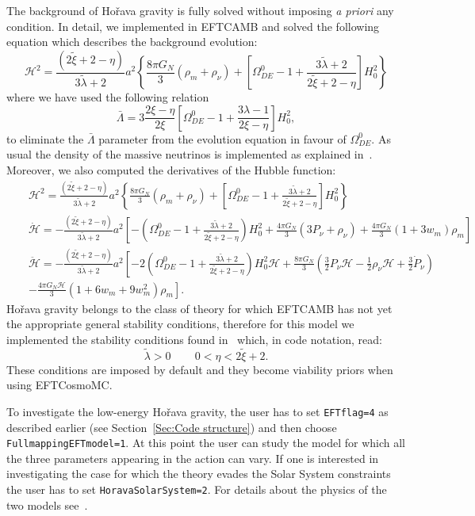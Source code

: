 \documentclass[prd,nofootinbib,showpacs]{revtex4}
\def\be{\begin{equation}}
\def\ee{\end{equation}}
\def\ba{\begin{eqnarray}}
\def\ea{\end{eqnarray}}
\def\l{\left}
\def\r{\right}
\def\f{\frac}
\def\nn{\nonumber}
\def\hub{{\mathcal H}}
\begin{document}
{The background of Ho\v rava gravity is fully solved without imposing \textit{a priori} any condition. In detail, we implemented in EFTCAMB and solved the following equation which describes the  background  evolution:
\be
\hub^2=\f{(2\tilde{\xi}+2-\eta)}{3\tilde{\lambda}+2}a^2\l\{\f{8\pi G_N}{3}(\rho_m+\rho_{\nu})+\l[\Omega_{DE}^0-1+ \f{3\tilde{\lambda}+2}{2\tilde{\xi}+2-\eta}\r]H_0^2 \r\}
\ee
where we have used the following relation
\be
\bar{\Lambda}= 3\f{2\xi-\eta}{2\xi}\l[\Omega_{DE}^0-1+\f{3\lambda-1}{2\xi-\eta}\r]H_0^2,
\ee
to eliminate the $\bar{\Lambda}$ parameter from the evolution equation in favour of $\Omega_{DE}^0$. As usual the density of the massive neutrinos is implemented as explained in~\cite{Hu:2014sea}. Moreover, we also computed the  derivatives of the Hubble function:
\ba
&&\hub^2=\f{(2\tilde{\xi}+2-\eta)}{3\tilde{\lambda}+2}a^2\l\{\f{8\pi G_N}{3}(\rho_m+\rho_{\nu})+\l[\Omega_{DE}^0-1+ \f{3\tilde{\lambda}+2}{2\tilde{\xi}+2-\eta}\r]H_0^2 \r\} \nn \\
&&\dot{\hub}= -\f{(2\tilde{\xi}+2-\eta)}{3\tilde{\lambda}+2}a^2\l[-\l(\Omega_{DE}^0-1+ \f{3\tilde{\lambda}+2}{2\tilde{\xi}+2-\eta}\r)H_0^2+\f{4\pi G_N}{3}(3P_{\nu}+\rho_{\nu})+\f{4\pi G_N}{3}(1+3w_m)\rho_m\r]  \nn \\
&&\ddot{\hub}=-\f{(2\tilde{\xi}+2-\eta)}{3\tilde{\lambda}+2}a^2\l[-2\l(\Omega_{DE}^0-1+ \f{3\tilde{\lambda}+2}{2\tilde{\xi}+2-\eta}\r)H_0^2\hub+\f{8\pi G_N}{3}(\f{3}{2}P_{\nu}\hub-\f{1}{2}\rho_{\nu}\hub+\f{3}{2}\dot{P}_{\nu}) \r. \nn \\&&\l.-\f{4\pi G_N \hub}{3}(1+6w_m +9w_m^2)\rho_m\r].
\ea
%
Ho\v rava gravity belongs to the class of theory for which EFTCAMB has not yet the appropriate general stability conditions, therefore for this model we implemented the stability conditions found in~\cite{Frusciante:2015maa} which, in code notation, read:
\be
\tilde{\lambda}>0\, \qquad 0<\eta<2\tilde{\xi}+2. 
\ee
These conditions are imposed by default and they become viability priors when using EFTCosmoMC.

To investigate  the low-energy  Ho\v rava gravity, the user has to set \verb|EFTflag=4| as described earlier (see Section~\ref{Sec:Code structure}) and then choose \verb|FullmappingEFTmodel=1|. At this point the user can study the model for which all the three parameters appearing in the action can vary. If one is interested in investigating the case for which the theory evades the Solar System constraints the user has to set \verb|HoravaSolarSystem=2|. For details about the physics of the two models see~\cite{Frusciante:2015maa}.

}
\end{document}
